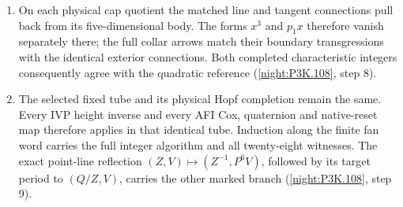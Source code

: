 \begin{enumerate}[label=\arabic*.]
\[  =\begin{pmatrix}2&1\\1&0\end{pmatrix}.
  \]
  The physical Euler restriction remains $(0,-1)$ through the
  held-Cox tautological line. The explicit primitive Hopf and
  conifold restriction maps retain the orientation, and the
  ordered source arc carries the actual E6-B sphere reference
  (\cref{night:P3K.108}, step 7).
\item On each physical cap quotient the matched line and tangent
  connections pull back from its five-dimensional body.
  The forms $x^3$ and $p_1x$ therefore vanish separately there;
  the full collar arrows match their boundary transgressions
  with the identical exterior connections. Both completed
  characteristic integers consequently agree with the
  quadratic reference (\cref{night:P3K.108}, step 8).
\item The selected fixed tube and its physical Hopf completion
  remain the same. Every IVP height inverse and every AFI Cox,
  quaternion and native-reset map therefore applies in that
  identical tube. Induction along the finite fan word carries
  the full integer algorithm and all twenty-eight witnesses.
  The exact point-line reflection
  $(Z,V)\mapsto(Z^{-1},P^6V)$, followed by its target period
  to $(Q/Z,V)$, carries the other marked branch
  (\cref{night:P3K.108}, step 9).
\end{enumerate}


